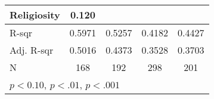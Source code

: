 {\begin{tabular}{l*{4}{c}}
    \addlinespace
    Religiosity         & 0.120\sym{*}   &                &                &                       \\
    \midrule
    R-sqr               & 0.5971         & 0.5257         & 0.4182         & 0.4427                \\
    Adj. R-sqr          & 0.5016         & 0.4373         & 0.3528         & 0.3703                \\
    N                   & 168            & 192            & 298            & 201                   \\
    \bottomrule
    \multicolumn{5}{l}{\footnotesize \sym{*} \(p<0.10\), \sym{**} \(p<.01\), \sym{***} \(p<.001\)} \\
\end{tabular}
}
